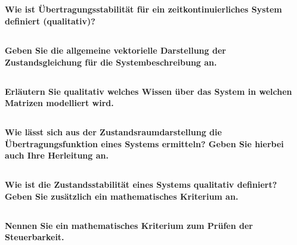 \subsection{}
\textbf{Wie ist Übertragungsstabilität für ein zeitkontinuierliches System definiert (qualitativ)?}

\subsection{}
\textbf{Geben Sie die allgemeine vektorielle Darstellung der Zustandsgleichung für die Systembeschreibung an.}

\subsection{}
\textbf{Erläutern Sie qualitativ welches Wissen über das System in welchen Matrizen modelliert wird.}

\subsection{}
\textbf{Wie lässt sich aus der Zustandsraumdarstellung die Übertragungsfunktion eines Systems ermitteln? Geben Sie hierbei auch Ihre Herleitung an.}

\subsection{}
\textbf{Wie ist die Zustandsstabilität eines Systems qualitativ definiert? Geben Sie zusätzlich ein mathematisches Kriterium an.}

\subsection{}
\textbf{Nennen Sie ein mathematisches Kriterium zum Prüfen der Steuerbarkeit.}